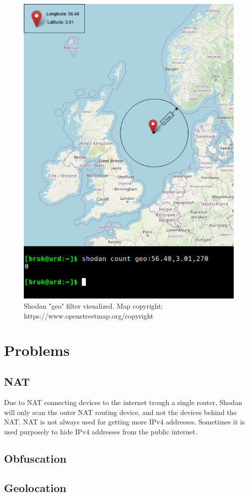 \begin{figure}
    \centering
    \includegraphics[scale=0.7]{Figurer/geolocation.png}
    \caption{Shodan "geo" filter visualized. Map copyright: https://www.openstreetmap.org/copyright}
    \label{fig:geolocation}
\end{figure}


\section{Problems}
\subsection{NAT}
Due to NAT connecting devices to the internet trough a single router, Shodan will only scan the outer NAT routing device, and not the devices behind the NAT. NAT is not always used for getting more IPv4 addresses. Sometimes it is used purposely to hide IPv4 addresses from the public internet.

\subsection{Obfuscation}

\subsection{Geolocation}
